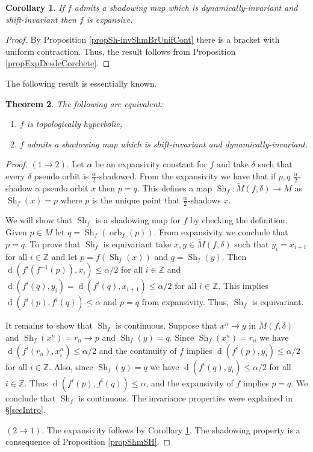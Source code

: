 \documentclass[12pt]{amsart}
\theoremstyle{plain}
\newtheorem{thm}{Theorem}[section]
\newtheorem{cor}[thm]{Corollary}
\theoremstyle{definition}
\theoremstyle{remark}
\DeclareMathOperator{\dist}{d}
\DeclareMathOperator{\orb}{orb}
\DeclareMathOperator{\shm}{Sh}
\newcommand{\Z}{\mathbb Z}
\newcommand{\tM}{\tilde{M}}
\begin{document}
\begin{cor}
	\label{corshmimpexp}
	If $f$ admits a shadowing map which is dynamically-invariant and shift-invariant then $f$ is expansive.
\end{cor}

\begin{proof}
	By Proposition \ref{propSh-invShmBrUnifCont} there is a bracket with uniform contraction. Thus, the result follows from Proposition \ref{propExpDesdeCorchete}.
\end{proof}

The following result is essentially known.

\begin{thm}
	\label{thmTopHypChar}
	The following are equivalent:
	\begin{enumerate}
		\item $f$ is topologically hyperbolic,
		\item $f$ admits a shadowing map which is shift-invariant and dynamically-invariant.
	\end{enumerate}
\end{thm}

\begin{proof}
	$(1\to 2)$.
	Let $\alpha$ be an expansivity constant for $f$ and take $\delta$ such that every $\delta$ pseudo orbit
	is $\frac \alpha 2$-shadowed.
	From the expansivity we have that if $p,q$ $\frac \alpha 2$-shadow a pseudo orbit $x$ then $p=q$.
	This defines a map $\shm_f\colon \tM(f,\delta)\to M$ as $\shm_f(x)=p$ where $p$ is the unique point that $\frac \alpha 2$-shadows $x$.

	We will show that $\shm_f$ is a shadowing map for $f$ by checking the definition.
	Given $p\in M$ let $q=\shm_f(\orb_f(p))$. From expansivity we conclude that $p=q$.
	To prove that $\shm_f$ is equivariant
	take $x,y\in \tM(f,\delta)$ such that $y_i=x_{i+1}$ for all $i\in\Z$ and let
	$p=f(\shm_f(x))$ and $q=\shm_f(y)$.
	Then $\dist(f^i(f^{-1}(p)),x_i)\leq\alpha/2$ for all $i\in\Z$ and
	$\dist(f^i(q),y_i)=\dist(f^i(q),x_{i+1})\leq\alpha/2$ for all $i\in\Z$.
	This implies $\dist(f^i(p),f^i(q))\leq \alpha$ and $p=q$ from expansivity. Thus, $\shm_f$ is equivariant.

	It remains to show that $\shm_f$ is continuous.
	Suppose that $x^n\to y$ in $\tM(f,\delta)$ and
	$\shm_f(x^n)=r_n\to p$ and $\shm_f(y)=q$.
	Since $\shm_f(x^n)=r_n$ we have $\dist(f^i(r_n),x^n_i)\leq\alpha/2$ and the continuity of $f$ implies
	$\dist(f^i(p),y_i)\leq\alpha/2$ for all $i\in\Z$. Also, since
	$\shm_f(y)=q$ we have $\dist(f^i(q),y_i)\leq\alpha/2$ for all $i\in\Z$.
	Thus $\dist(f^i(p),f^i(q))\leq\alpha$, and the expansivity of $f$ implies $p=q$.
	We conclude that $\shm_f$ is continuous.
	The invariance properties were explained in \S\ref{secIntro}.

	$(2\to 1)$. The expansivity follows by Corollary \ref{corshmimpexp}. The shadowing property is a consequence of Proposition \ref{propShmSH}.
\end{proof}
\end{document}
